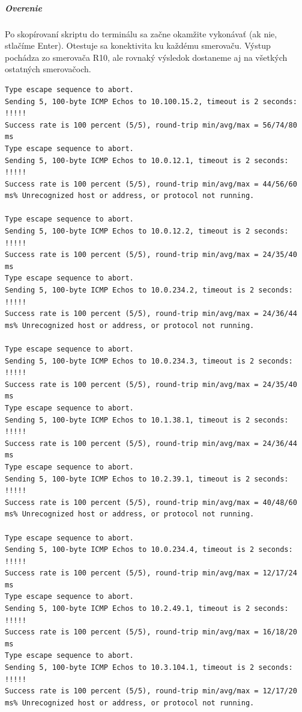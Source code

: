 \documentclass[12pt,twoside,a4paper]{article}
\begin{document}
\subparagraph{Overenie}
\subparagraph{}
Po skopírovaní skriptu do terminálu sa začne okamžite vykonávať (ak nie, stlačíme Enter). Otestuje sa konektivita ku každému smerovaču. Výstup pochádza zo smerovača R10, ale rovnaký výsledok dostaneme aj na všetkých ostatných smerovačoch.


\noindent
{\selectfont
\begin{small}
\begin{verbatim}
Type escape sequence to abort.
Sending 5, 100-byte ICMP Echos to 10.100.15.2, timeout is 2 seconds:
!!!!!
Success rate is 100 percent (5/5), round-trip min/avg/max = 56/74/80 ms
Type escape sequence to abort.
Sending 5, 100-byte ICMP Echos to 10.0.12.1, timeout is 2 seconds:
!!!!!
Success rate is 100 percent (5/5), round-trip min/avg/max = 44/56/60 ms% Unrecognized host or address, or protocol not running.

Type escape sequence to abort.
Sending 5, 100-byte ICMP Echos to 10.0.12.2, timeout is 2 seconds:
!!!!!
Success rate is 100 percent (5/5), round-trip min/avg/max = 24/35/40 ms
Type escape sequence to abort.
Sending 5, 100-byte ICMP Echos to 10.0.234.2, timeout is 2 seconds:
!!!!!
Success rate is 100 percent (5/5), round-trip min/avg/max = 24/36/44 ms% Unrecognized host or address, or protocol not running.

Type escape sequence to abort.
Sending 5, 100-byte ICMP Echos to 10.0.234.3, timeout is 2 seconds:
!!!!!
Success rate is 100 percent (5/5), round-trip min/avg/max = 24/35/40 ms
Type escape sequence to abort.
Sending 5, 100-byte ICMP Echos to 10.1.38.1, timeout is 2 seconds:
!!!!!
Success rate is 100 percent (5/5), round-trip min/avg/max = 24/36/44 ms
Type escape sequence to abort.
Sending 5, 100-byte ICMP Echos to 10.2.39.1, timeout is 2 seconds:
!!!!!
Success rate is 100 percent (5/5), round-trip min/avg/max = 40/48/60 ms% Unrecognized host or address, or protocol not running.

Type escape sequence to abort.
Sending 5, 100-byte ICMP Echos to 10.0.234.4, timeout is 2 seconds:
!!!!!
Success rate is 100 percent (5/5), round-trip min/avg/max = 12/17/24 ms
Type escape sequence to abort.
Sending 5, 100-byte ICMP Echos to 10.2.49.1, timeout is 2 seconds:
!!!!!
Success rate is 100 percent (5/5), round-trip min/avg/max = 16/18/20 ms
Type escape sequence to abort.
Sending 5, 100-byte ICMP Echos to 10.3.104.1, timeout is 2 seconds:
!!!!!
Success rate is 100 percent (5/5), round-trip min/avg/max = 12/17/20 ms% Unrecognized host or address, or protocol not running.


\end{verbatim}
\end{small}}
\end{document}
